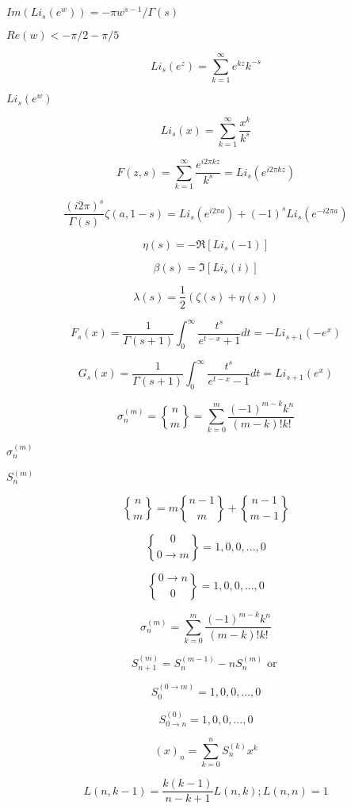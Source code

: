 \documentclass{article}
\begin{document}
$ Im(Li_s(e^w)) = -\pi w^{s-1}/\Gamma(s) $
\pagebreak

$ Re(w) < -\pi/2 - \pi/5 $
\pagebreak

\[ Li_s(e^z) = \sum_{k=1}^{\infty} e^{kz} k^{-s} \]
\pagebreak

$ Li_s(e^w) $
\pagebreak

\[ Li_s(x) = \sum_{k=1}^{\infty} \frac{x^k}{k^s} \]
\pagebreak

\[ F(z,s) = \sum_{k=1}^{\infty} \frac{e^{i2\pi kz}}{k^s} = Li_s(e^{i2\pi kz}) \]
\pagebreak

\[ \frac{(i2\pi)^s}{\Gamma(s)}\zeta(a,1-s) = Li_s(e^{i2\pi a}) + (-1)^s Li_s(e^{-i2\pi a}) \]
\pagebreak

\[ \eta(s) = -\Re[Li_s(-1)] \]
\pagebreak

\[ \beta(s) = \Im[Li_s(i)] \]
\pagebreak

\[ \lambda(s) = \frac{1}{2}(\zeta(s) + \eta(s)) \]
\pagebreak

\[ F_s(x) = \frac{1}{\Gamma(s+1)}\int_0^\infty \frac{t^s}{e^{t-x} + 1}dt = -Li_{s+1}(-e^x) \]
\pagebreak

\[ G_s(x) = \frac{1}{\Gamma(s+1)}\int_0^\infty \frac{t^s}{e^{t-x} - 1}dt = Li_{s+1}(e^x) \]
\pagebreak

\[ \sigma_n^{(m)} = \genfrac{\{}{\}}{0pt}{0}{n}{m} = \sum_{k=0}^{m}\frac{(-1)^{m-k}k^n}{(m-k)!k!} \]
\pagebreak

$ \sigma_n^{(m)} $
\pagebreak

$ \textit{S}_n^{(m)} $
\pagebreak

\[ \genfrac{\{}{\}}{0pt}{0}{n}{m} = m \genfrac{\{}{\}}{0pt}{0}{n-1}{m} + \genfrac{\{}{\}}{0pt}{0}{n-1}{m-1} \]
\pagebreak

\[ \genfrac{\{}{\}}{0pt}{0}{0}{0\rightarrow m} = {1, 0, 0, ..., 0} \]
\pagebreak

\[ \genfrac{\{}{\}}{0pt}{0}{0\rightarrow n}{0} = {1, 0, 0, ..., 0} \]
\pagebreak

\[ \sigma_n^{(m)} = \sum_{k=0}^{m}\frac{(-1)^{m-k}k^n}{(m-k)!k!} \]
\pagebreak

\[ S_{n+1}^{(m)} = S_n^{(m-1)} - n S_n^{(m)} \mbox{ or } \]
\pagebreak

\[ S_0^{(0\rightarrow m)} = {1, 0, 0, ..., 0} \]
\pagebreak

\[ S_{0\rightarrow n}^{(0)} = {1, 0, 0, ..., 0} \]
\pagebreak

\[ (x)_n = \sum_{k=0}^{n} S_n^{(k)} x^k \]
\pagebreak

\[ L(n,k-1) = \frac{k(k-1)}{n-k+1}L(n,k); L(n,n) = 1 \]
\pagebreak
\end{document}
